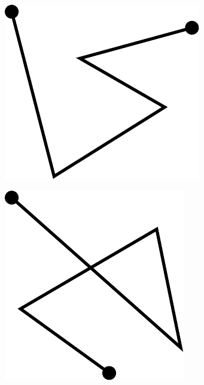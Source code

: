 \begin{figure}[h!]
\centering
\begin{subfigure}{.3\textwidth}
  \centering
  \includegraphics[width=.9\linewidth]{images/linestring_normal.pdf}
  \caption{}
  \label{fig:linestring_normal}
\end{subfigure}
\begin{subfigure}{.3\textwidth}
  \centering
  \includegraphics[width=.8\linewidth]{images/linestring_intersect.pdf}
  \caption{}
  \label{fig:linestring_intersect}
\end{subfigure}

\end{figure}
